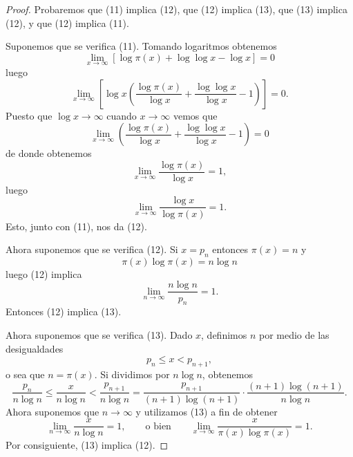 \documentclass[12pt,a4paper]{book}
\begin{document}
    \begin{proof}
        Probaremos que (11) implica (12), que (12) implica (13), que (13) implica
        (12), y que (12) implica (11).

        Suponemos que se verifica (11). Tomando logaritmos obtenemos
        \begin{equation*}
            \lim_{x\to\infty}\left[\log\pi(x)+\log\log x-\log x\right]=0
        \end{equation*}
        luego
        \begin{equation*}
            \lim_{x\to\infty}\left[\log x\left(\frac{\log\pi(x)}{\log x}
            +\frac{\log\log x}{\log x}-1\right)\right]=0.
        \end{equation*}
        Puesto que $\log x\to\infty$ cuando $x\to\infty$ vemos que
        \begin{equation*}
            \lim_{x\to\infty}\left(\frac{\log\pi(x)}{\log x}+\frac{\log\log x}{\log x}-1\right)=0
        \end{equation*}
        de donde obtenemos
        \begin{equation*}
            \lim_{x\to\infty}\frac{\log\pi(x)}{\log x}=1,
        \end{equation*}
        luego
        \begin{equation*}
            \lim_{x\to\infty}\frac{\log x}{\log\pi(x)}=1.
        \end{equation*}
        Esto, junto con (11), nos da (12).

        Ahora suponemos que se verifica (12). Si $x=p_{n}$ entonces $\pi(x)=n$ y
        \begin{equation*}
            \pi(x)\log\pi(x)=n\log n
        \end{equation*}
        luego (12) implica
        \begin{equation*}
            \lim_{n\to\infty}\frac{n\log n}{p_{n}}=1.
        \end{equation*}
        Entonces (12) implica (13).

        Ahora suponemos que se verifica (13). Dado $x$, definimos $n$ por medio de las
        desigualdades
        \begin{equation*}
            p_{n}\leq x<p_{n+1},
        \end{equation*}
        o sea que $n=\pi(x)$. Si dividimos por $n\log n$, obtenemos
        \begin{equation*}
            \frac{p_{n}}{n\log n}\leq\frac{x}{n\log n}<\frac{p_{n+1}}{n\log n}
            =\frac{p_{n+1}}{(n+1)\log(n+1)}\cdot\frac{(n+1)\log(n+1)}{n\log n}.
        \end{equation*}
        Ahora suponemos que $n\to\infty$ y utilizamos (13) a fin de obtener
        \begin{equation*}
            \lim_{n\to\infty}\frac{x}{n\log n}=1,\qquad\text{o bien}\qquad
            \lim_{x\to\infty}\frac{x}{\pi(x)\log\pi(x)}=1.
        \end{equation*}
        Por consiguiente, (13) implica (12).


\end{proof}
\end{document}
